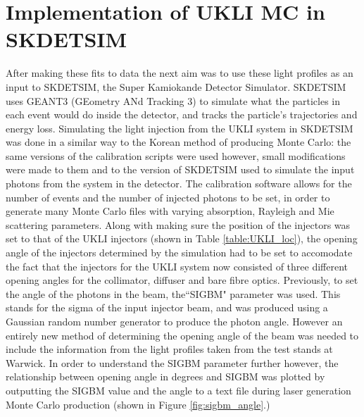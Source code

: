 \begin{figure}[!htbp]
    
\end{figure}


\section{Implementation of UKLI MC in SKDETSIM}
After making these fits to data the next aim was to use these light profiles as an input to SKDETSIM, the Super Kamiokande Detector Simulator. SKDETSIM uses GEANT3 (GEometry ANd Tracking 3) to simulate what the particles in each event would do inside the detector, and tracks the particle's trajectories and energy loss. Simulating the light injection from the UKLI system in SKDETSIM was done in a similar way to the Korean method of producing Monte Carlo: the same versions of the calibration scripts were used however, small modifications were made to them and to the version of SKDETSIM used to simulate the input photons from the system in the detector. The calibration software allows for the number of events and the number of injected photons to be set, in order to generate many Monte Carlo files with varying absorption, Rayleigh and Mie scattering parameters. 
\newline
Along with making sure the position of the injectors was set to that of the UKLI injectors (shown in Table \ref{table:UKLI_loc}), the opening angle of the injectors determined by the simulation had to be set to accomodate the fact that the injectors for the UKLI system now consisted of three different opening angles for the collimator, diffuser and bare fibre optics. Previously, to set the angle of the photons in the beam, the``SIGBM" parameter was used. This stands for the sigma of the input injector beam, and was produced using a Gaussian random number generator to produce the photon angle. However an entirely new method of determining the opening angle of the beam was needed to include the information from the light profiles taken from the test stands at Warwick. In order to understand the SIGBM parameter further however, the relationship between opening angle in degrees and SIGBM was plotted by outputting the SIGBM value and the angle to a text file during laser generation Monte Carlo production (shown in Figure \ref{fig:sigbm_angle}.)

